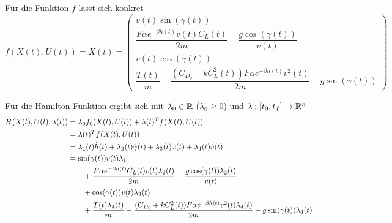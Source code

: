 Für die Funktion $f$ lässt sich konkret
\begin{equation} \label{equ:state_space}
    f(X(t),U(t)) = \dot{X}(t) = \begin{pmatrix}
        v(t) \sin(\gamma(t)) \\ 
        \dfrac{F \alpha e^{-\beta h(t)} v(t) C_L(t)}{2m} - \dfrac{g \cos(\gamma(t))}{v(t)} \\ 
        v(t) \cos(\gamma(t)) \\ 
        \dfrac{T(t)}{m} - \dfrac{(C_{D_0} + k C_L^2(t)) F \alpha e^{-\beta h(t)} v^2(t)}{2m} - g \sin(\gamma(t))
    \end{pmatrix}
\end{equation}

Für die Hamilton-Funktion ergibt sich mit $\lambda_0 \in \mathbb{R}$ ($\lambda_0 \geq 0$) und $\lambda : [t_0,t_f] \to \mathbb{R}^n$
\begin{equation} \label{equ:hamilt_func}
    \begin{split}
        H(X(t),U(t),\lambda(t)) &= \lambda_0 f_0(X(t),U(t)) + \lambda(t)^T f(X(t),U(t)) \\\
        &= \lambda(t)^T f(X(t),U(t)) \\\
        &= \lambda_1(t) \dot{h}(t) + \lambda_2(t) \dot{\gamma}(t) + \lambda_3(t) \dot{x}(t) + \lambda_4(t) \dot{v}(t) \\\
        &= \sin(\gamma(t)) v(t) \lambda_1 \\\
        &\hspace{7mm} + \dfrac{F \alpha e^{-\beta h(t)} C_L(t) v(t) \lambda_2(t)}{2m} - \dfrac{g \cos(\gamma(t)) \lambda_2(t)}{v(t)} \\\
        &\hspace{7mm} + \cos(\gamma(t)) v(t) \lambda_3(t) \\\
        &\hspace{7mm} + \dfrac{T(t) \lambda_4(t)}{m} - \dfrac{(C_{D_0} + k C_L^2(t)) F \alpha e^{-\beta h(t)} v^2(t) \lambda_4(t)}{2m} - g \sin(\gamma(t)) \lambda_4(t)
    \end{split}
\end{equation}

